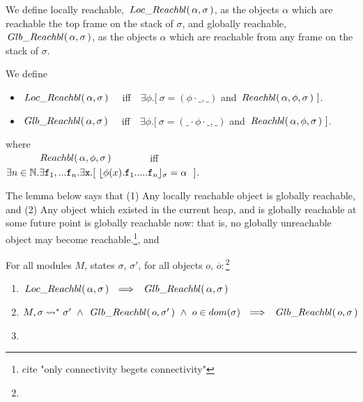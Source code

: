 We define  locally reachable, $ \,Loc\_Reachbl(\,\alpha,\sigma\,) $, as  the objects  $\alpha$ which are reachable the top frame on the stack of $\sigma$,
and globally reachable, $\,Glb\_Reachbl(\,\alpha,\sigma\,)$, as the objects  $\alpha$ which  are reachable from any  frame on the stack of $\sigma$.
 
\begin{definition} We define 
\begin{itemize}
\item
$ \,Loc\_Reachbl(\,\alpha,\sigma\,) $ \ \ iff\ \  
$\exists \phi.[\ \sigma=(\phi\cdot\_, \_)$ and $\Relevant \alpha \phi \sigma\ ]$. %
\item
$\,Glb\_Reachbl(\,\alpha,\sigma\,)$  \ \ iff\ \  
$\exists \phi.[\ \sigma=(\_\cdot\phi\cdot\_, \_)$ and $\Relevant \alpha \phi \sigma\ ]$. %
\end{itemize}
where\\
$\strut\ \ \ \  \ \ \ \ \ \ \,Reachbl(\,\alpha,\phi,\sigma\,) $  \ \ \ \ \ \ \ iff\ \  
$\exists n\in \mathbb{N}.\exists \prg{f}_1,... \prg{f}_n.\exists \prg{x}.[ \ \interpret{\sigma}{\phi(x).\prg{f}_1.....\prg{f}_n} = \alpha \ \ ]$.

\end{definition}


The lemma below says that (1) Any locally reachable object is globally reachable, and 
(2) Any object which existed in the current  heap, and is globally reachable at some future point is globally reachable now: that is, 
no globally unreachable object may become reachable.\footnote{cite "only connectivity begets connectivity"}, and



\begin{lemma}
\label{lemma:relevant}
For all modules $M$, states $\sigma$, $\sigma'$, for all objects $o$, ${\overline o}:$\footnote{}
\begin{enumerate}
\item
$ \LRelevant \alpha \sigma\ \ \Longrightarrow \ \   \GRelevant \alpha \sigma$
\item
$M, \sigma  \leadsto^*   {\sigma'} \ \wedge \  \GRelevant o {\sigma'} \ \wedge \ o\in dom(\sigma) \ \ \Longrightarrow \ \  \GRelevant o {\sigma}$
\item
\sdN{$\LRelevant {\overline o} {\sigma} \ \ \wedge \sigma'\in \Pushes{o} {\sigma}\ \ \wedge \  \LRelevant o {\sigma'} \ \ \ \Longrightarrow \ \ \  \LRelevant o {\sigma}$
}
\end{enumerate}
\end{lemma}

